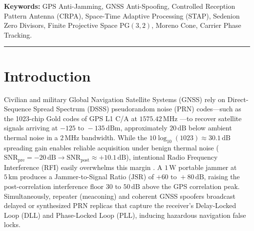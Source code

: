 \documentclass[11pt,a4paper]{article}
\theoremstyle{definition}
\theoremstyle{remark}
\newcommand{\PG}{\mathrm{PG}}
\begin{document}
\noindent\textbf{Keywords:} GPS Anti-Jamming, GNSS Anti-Spoofing, Controlled Reception Pattern Antenna (CRPA), Space-Time Adaptive Processing (STAP), Sedenion Zero Divisors, Finite Projective Space $\PG(3,2)$, Moreno Cone, Carrier Phase Tracking.

\vspace{1em}
\hrule
\vspace{1.5em}

\section{Introduction}
\label{sec:intro}

Civilian and military Global Navigation Satellite Systems (GNSS) rely on Direct-Sequence Spread Spectrum (DSSS) pseudorandom noise (PRN) codes---such as the 1023-chip Gold codes of GPS L1 C/A at $1575.42\,\mathrm{MHz}$ \cite{ISGPS200,Kaplan2017}---to recover satellite signals arriving at $-125\text{ to }-135\,\mathrm{dBm}$, approximately $20\,\mathrm{dB}$ below ambient thermal noise in a $2\,\mathrm{MHz}$ bandwidth. While the $10\log_{10}(1023) \approx 30.1\,\mathrm{dB}$ spreading gain enables reliable acquisition under benign thermal noise ($\mathrm{SNR}_{\mathrm{pre}} = -20\,\mathrm{dB} \to \mathrm{SNR}_{\mathrm{post}} \approx +10.1\,\mathrm{dB}$), intentional Radio Frequency Interference (RFI) easily overwhelms this margin \cite{BorIO2018,Amin2016}. A $1\,\mathrm{W}$ portable jammer at $5\,\mathrm{km}$ produces a Jammer-to-Signal Ratio ($\mathrm{JSR}$) of $+60\text{ to }+80\,\mathrm{dB}$, raising the post-correlation interference floor $30\text{ to }50\,\mathrm{dB}$ above the GPS correlation peak. Simultaneously, repeater (meaconing) and coherent GNSS spoofers \cite{Psiaki2016} broadcast delayed or synthesized PRN replicas that capture the receiver's Delay-Locked Loop (DLL) and Phase-Locked Loop (PLL), inducing hazardous navigation false locks.
\end{document}
